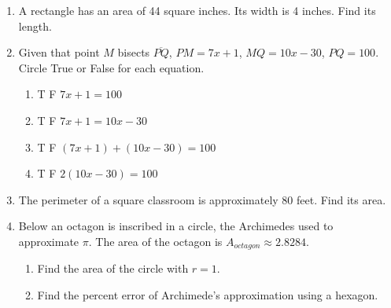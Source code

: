 \begin{enumerate}
\item A rectangle has an area of 44 square inches. Its width is 4 inches. Find its length.
\vspace{3.0cm}

\item Given that point $M$ bisects $\overline{PQ}$, $PM=7x+1$, $MQ=10x-30$, $PQ=100$. Circle True or False for each equation.
  \begin{multicols}{2}
    \begin{enumerate}
      \item T \quad F \quad $7x+1=100$
      \item T \quad F \quad $7x+1=10x-30$
      \item T \quad F \quad $(7x+1) + (10x-30) = 100$
      \item T \quad F \quad $2(10x-30)=100$
    \end{enumerate}
  \end{multicols}

\newpage
\item The perimeter of a square classroom is approximately 80 feet. Find its area. \vspace{3cm}

\item Below an octagon is inscribed in a circle, the Archimedes used to approximate $\pi$. The area of the octagon is $A_{octagon} \approx 2.8284$.
  \begin{multicols}{2}
  \raggedcolumns
  \begin{enumerate}[itemsep=2cm]
    \item Find the area of the circle with $r=1$.
    \item Find the percent error of Archimede's approximation using a hexagon.
  \end{enumerate}
  \begin{flushright}
  \end{flushright}
  \end{multicols} \vspace{1cm}


\end{enumerate}
